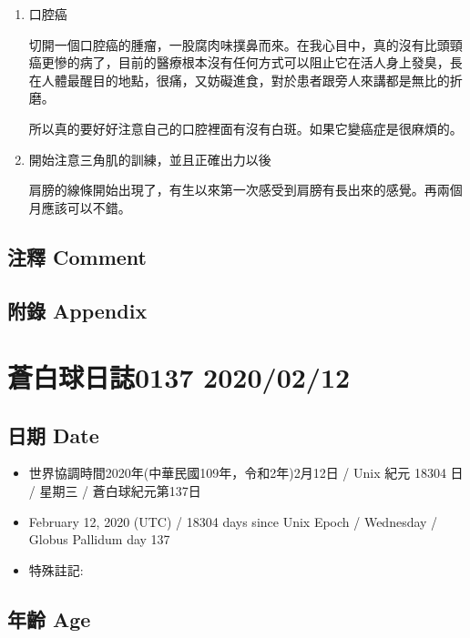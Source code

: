 \documentclass[a5paper, 12pt
]{book}
\providecommand{\tightlist}{%
  \setlength{\itemsep}{0pt}\setlength{\parskip}{0pt}}
\begin{document}
\begin{enumerate}
\def\labelenumi{\arabic{enumi}.}
\item
  口腔癌

  切開一個口腔癌的腫瘤，一股腐肉味撲鼻而來。在我心目中，真的沒有比頭頸癌更慘的病了，目前的醫療根本沒有任何方式可以阻止它在活人身上發臭，長在人體最醒目的地點，很痛，又妨礙進食，對於患者跟旁人來講都是無比的折磨。

  所以真的要好好注意自己的口腔裡面有沒有白斑。如果它變癌症是很麻煩的。
\item
  開始注意三角肌的訓練，並且正確出力以後

  肩膀的線條開始出現了，有生以來第一次感受到肩膀有長出來的感覺。再兩個月應該可以不錯。
\end{enumerate}

\hypertarget{ux6ce8ux91cb-comment-71}{%
\subsection{注釋 Comment}\label{ux6ce8ux91cb-comment-71}}

\hypertarget{ux9644ux9304-appendix-72}{%
\subsection{附錄 Appendix}\label{ux9644ux9304-appendix-72}}

\hypertarget{ux84bcux767dux7403ux65e5ux8a8c0137-20200212}{%
\section{蒼白球日誌0137
2020/02/12}\label{ux84bcux767dux7403ux65e5ux8a8c0137-20200212}}

\hypertarget{ux65e5ux671f-date-73}{%
\subsection{日期 Date}\label{ux65e5ux671f-date-73}}

\begin{itemize}
\tightlist
\item
  世界協調時間2020年(中華民國109年，令和2年)2月12日 / Unix 紀元 18304 日
  / 星期三 / 蒼白球紀元第137日
\item
  February 12, 2020 (UTC) / 18304 days since Unix Epoch / Wednesday /
  Globus Pallidum day 137
\item
  特殊註記:
\end{itemize}

\hypertarget{ux5e74ux9f61-age-73}{%
\subsection{年齡 Age}\label{ux5e74ux9f61-age-73}}
\end{document}
